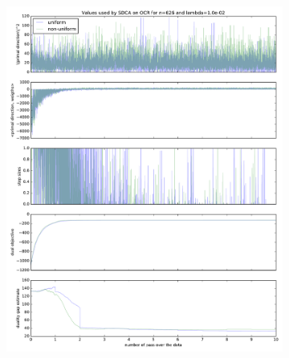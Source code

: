 \documentclass{article}
\DeclareMathOperator{\1}{\mathbb{1}}
\begin{document}
\begin{figure}[ht]
\begin{subfigure}[t]{0.3\textwidth}
        \includegraphics[width=\textwidth]{images/20170914_041645_ocr_annex.pdf}
    \end{subfigure}
    ~
    \begin{subfigure}[t]{0.3\textwidth}
        \centering

\end{subfigure}
\end{figure}
\end{document}
